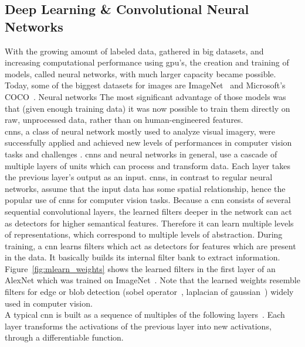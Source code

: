 \subsection{Deep Learning \& Convolutional Neural Networks}
With the growing amount of labeled data, gathered in big datasets, and increasing computational performance using \gls{gpu}'s, the creation and training of models, called neural networks, with much larger capacity became possible. Today, some of the biggest datasets for images are ImageNet~\cite{Russakovsky2015ImageNetChallenge} and Microsoft's COCO~\cite{Lin2014MicrosoftContext}.
Neural networks
The most significant advantage of those models was that (given enough training data) it was now possible to train them directly on raw, unprocessed data, rather than on human-engineered features.\\
\gls{cnns}, a class of neural network mostly used to analyze visual imagery, were successfully applied \cite{Lecun2015DeepLearning} and achieved new levels of performances in computer vision tasks and challenges \cite{Krizhevsky2012ImageNetNetworks,Simonyan2014VeryRecognition,Szegedy2014GoingConvolutions,He2015DeepRecognition,Zeiler2014VisualizingNetworks}. 
\gls{cnn}s and neural networks in general, use a cascade of multiple layers of units which can process
and transform data. Each layer takes the previous layer's output as an input. \gls{cnn}s, in contrast to regular neural networks, assume that the input data has some spatial relationship, hence the popular use of \gls{cnn}s for computer vision tasks. Because a \gls{cnn} consists of several sequential convolutional layers, the learned filters deeper in the network can act as detectors for higher semantical features. Therefore it can learn multiple levels of representations, which correspond to multiple levels of abstraction. During training, a \gls{cnn} learns filters which act as detectors for features which are present in the data. It basically builds its internal filter bank to extract information. Figure~\ref{fig:mlearn_weights} shows the learned filters in the first layer of an AlexNet which was trained on ImageNet~\cite{Russakovsky2015ImageNetChallenge}. Note that the learned weights resemble filters for edge or blob detection (sobel operator~\cite{Sobel1990AnOperator}, laplacian of gaussian~\cite{Marr187}) widely used in computer vision.\\
A typical \gls{cnn} is built as a sequence of multiples of the following layers~\cite{KarpathyStanfordRecognition}. Each layer transforms the activations of the previous layer into new activations, through a differentiable function.\\

